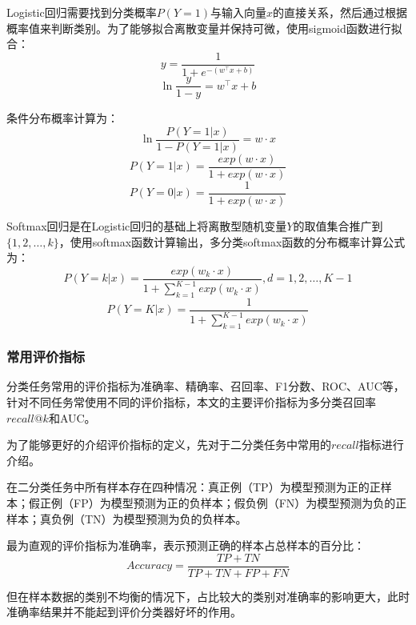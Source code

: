 \documentclass[master]{thesis-uestc}
\begin{document}
Logistic回归需要找到分类概率$P(Y=1)$与输入向量$x$的直接关系，然后通过根据概率值来判断类别。为了能够拟合离散变量并保持可微，使用sigmoid函数进行拟合：
\begin{equation}
   y=\frac{1}{1+e^{-(w^{\top}x+b)}}
\end{equation}
\begin{equation}
   \ln\frac{y}{1-y}=w^{\top}x+b
\end{equation}

条件分布概率计算为：
\begin{equation}
   \ln \frac{P(Y=1|x)}{1-P(Y=1|x)}=w\cdot x
\end{equation}
\begin{equation}
   P(Y=1|x)=\frac{exp(w\cdot x)}{1+exp(w\cdot x)}
\end{equation}
\begin{equation}
   P(Y=0|x)=\frac{1}{1+exp(w\cdot x)}
\end{equation}

Softmax回归是在Logistic回归的基础上将离散型随机变量$Y$的取值集合推广到$\{1,2,\dots,k\}$，使用softmax函数计算输出，多分类softmax函数的分布概率计算公式为：
\begin{equation}
   P(Y=k|x)=\frac{exp(w_k\cdot x)}{1+\sum_{k=1}^{K-1}exp(w_k\cdot x)},d=1,2,\dots,K-1
\end{equation}
\begin{equation}
   P(Y=K|x)=\frac{1}{1+\sum_{k=1}^{K-1}exp(w_k\cdot x)}
\end{equation}

\subsubsection{常用评价指标}
分类任务常用的评价指标为准确率、精确率、召回率、F1分数、ROC、AUC等，针对不同任务常使用不同的评价指标，本文的主要评价指标为多分类召回率$recall@k$和AUC。

为了能够更好的介绍评价指标的定义，先对于二分类任务中常用的$recall$指标进行介绍。

在二分类任务中所有样本存在四种情况：真正例（TP）为模型预测为正的正样本；假正例（FP）为模型预测为正的负样本；假负例（FN）为模型预测为负的正样本；真负例（TN）为模型预测为负的负样本。

最为直观的评价指标为准确率，表示预测正确的样本占总样本的百分比：
\begin{equation}
   Accuracy=\frac{TP+TN}{TP+TN+FP+FN}
\end{equation}

但在样本数据的类别不均衡的情况下，占比较大的类别对准确率的影响更大，此时准确率结果并不能起到评价分类器好坏的作用。
\end{document}
